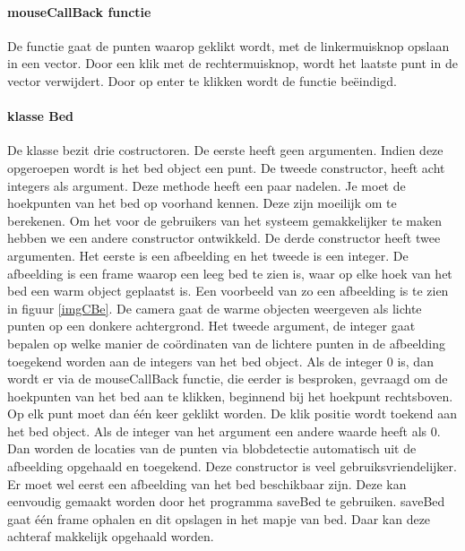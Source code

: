 \paragraph{mouseCallBack functie}
 De functie gaat de punten waarop geklikt wordt, met de linkermuisknop opslaan in een vector. Door een klik met de rechtermuisknop, wordt het laatste punt in de vector verwijdert. Door op enter te klikken wordt de functie be\"eindigd. 
 
\paragraph{klasse Bed}
De klasse bezit drie costructoren. De eerste heeft geen argumenten. Indien deze opgeroepen wordt is het bed object een punt. De tweede constructor, heeft acht integers als argument. Deze methode heeft een paar nadelen. Je moet de hoekpunten van het bed op voorhand kennen. Deze zijn moeilijk om te berekenen. Om het voor de gebruikers van het systeem gemakkelijker te maken hebben we een andere constructor ontwikkeld.  De derde constructor heeft twee argumenten. Het eerste is een afbeelding en het tweede is een integer. De afbeelding is een frame waarop een leeg bed te zien is, waar op elke hoek van het bed een warm object geplaatst is. Een voorbeeld van zo een afbeelding is te zien in figuur \ref{imgCBe}. De camera gaat de warme objecten weergeven als lichte punten op een donkere achtergrond. Het tweede argument, de integer gaat bepalen op welke manier de co\"ordinaten van de lichtere punten in de afbeelding toegekend worden aan de integers van het bed object. Als de integer 0 is, dan wordt er via de mouseCallBack functie, die eerder is besproken, gevraagd om de hoekpunten van het bed aan te klikken, beginnend bij het hoekpunt rechtsboven. Op elk punt moet dan \'e\'en keer geklikt worden. De klik positie wordt toekend aan het bed object. Als de integer van het argument een andere waarde heeft als 0. Dan worden de locaties van de punten via blobdetectie automatisch uit de afbeelding opgehaald en toegekend. Deze constructor is veel gebruiksvriendelijker. Er moet wel eerst een afbeelding van het bed beschikbaar zijn. Deze kan eenvoudig gemaakt worden door het programma saveBed te gebruiken. saveBed gaat \'e\'en frame ophalen en dit opslagen in het mapje van bed. Daar kan deze achteraf makkelijk opgehaald worden.\\
